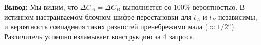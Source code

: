 ﻿\documentclass[9pt,a4paper]{extarticle}
\begin{document}
\textbf{Вывод:} Мы видим, что \(\Delta C_A = \Delta C_B\) выполняется со 100\% вероятностью. В истинном настраиваемом блочном шифре перестановки для \(t_A\) и \(t_B\) независимы, и вероятность совпадения таких разностей пренебрежимо мала (\(\approx 1/2^n\)). Различитель успешно взламывает конструкцию за 4 запроса.
\end{document}

